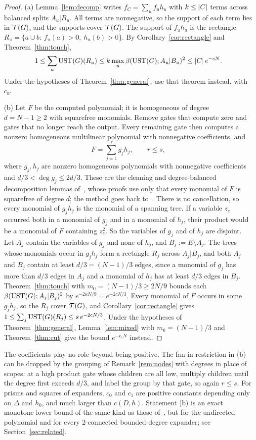 \begin{proof}
(a) Lemma~\ref{lem:decomp} writes $f_C=\sum_{u}f_uh_u$ with $k\le\lvert C\rvert$ terms across balanced splits $A_u|B_u$. All terms are nonnegative, so the support of each term lies in $\mathcal{T}(G)$, and the supports cover $\mathcal{T}(G)$. The support of $f_uh_u$ is the rectangle $R_u=\{a\cup b:\ f_u(a)>0,\ h_u(b)>0\}$. By Corollary~\ref{cor:rectangle} and Theorem~\ref{thm:touch},
\[
  1\le\sum_u\mathrm{UST}(G)(R_u)\le k\max_u\beta(\mathrm{UST}(G);A_u|B_u)^2\le\lvert C\rvert\,e^{-cN}.
\]
Under the hypotheses of Theorem~\ref{thm:general}, use that theorem instead, with $c_0$.

(b) Let $F$ be the computed polynomial; it is homogeneous of degree $d=N-1\ge2$ with squarefree monomials. Remove gates that compute zero and gates that no longer reach the output. Every remaining gate then computes a nonzero homogeneous multilinear polynomial with nonnegative coefficients, and
\[
  F=\sum_{j=1}^{r}g_jh_j,\qquad r\le s,
\]
where $g_j,h_j$ are nonzero homogeneous polynomials with nonnegative coefficients and $d/3<\deg g_j\le2d/3$. These are the cleaning and degree-balanced decomposition lemmas of~\cite[Lemmas~7.3 and~7.4]{Blaschke26Dimers}, whose proofs use only that every monomial of $F$ is squarefree of degree $d$; the method goes back to~\cite{Valiant80,JerrumSnir82}. There is no cancellation, so every monomial of $g_jh_j$ is the monomial of a spanning tree. If a variable $z_e$ occurred both in a monomial of $g_j$ and in a monomial of $h_j$, their product would be a monomial of $F$ containing $z_e^2$. So the variables of $g_j$ and of $h_j$ are disjoint. Let $A_j$ contain the variables of $g_j$ and none of $h_j$, and $B_j:=E\setminus A_j$. The trees whose monomials occur in $g_jh_j$ form a rectangle $R_j$ across $A_j|B_j$, and both $A_j$ and $B_j$ contain at least $d/3=(N-1)/3$ edges, since a monomial of $g_j$ has more than $d/3$ edges in $A_j$ and a monomial of $h_j$ has at least $d/3$ edges in $B_j$. Theorem~\ref{thm:touch} with $m_0=(N-1)/3\ge2N/9$ bounds each $\beta(\mathrm{UST}(G);A_j|B_j)^2$ by $e^{-2\kappa N/9}=e^{-2cN/3}$. Every monomial of $F$ occurs in some $g_jh_j$, so the $R_j$ cover $\mathcal{T}(G)$, and Corollary~\ref{cor:rectangle} gives $1\le\sum_j\mathrm{UST}(G)(R_j)\le s\,e^{-2cN/3}$. Under the hypotheses of Theorem~\ref{thm:general}, Lemma~\ref{lem:mixed} with $m_0=(N-1)/3$ and Theorem~\ref{thm:cut} give the bound $e^{-c_1N}$ instead.
\end{proof}

The coefficients play no role beyond being positive. The fan-in restriction in (b) can be dropped by the grouping of Remark~\ref{rem:nodes} with degrees in place of scopes: at a high product gate whose children are all low, multiply children until the degree first exceeds $d/3$, and label the group by that gate, so again $r\le s$. For prisms and squares of expanders, $c_0$ and $c_1$ are positive constants depending only on $\Delta$ and $h_0$, and much larger than $c(D,h)$. Statement (b) is an exact monotone lower bound of the same kind as those of~\cite{CDM20Negations,CDGM22}, but for the undirected polynomial and for every 2-connected bounded-degree expander; see Section~\ref{sec:related}.
